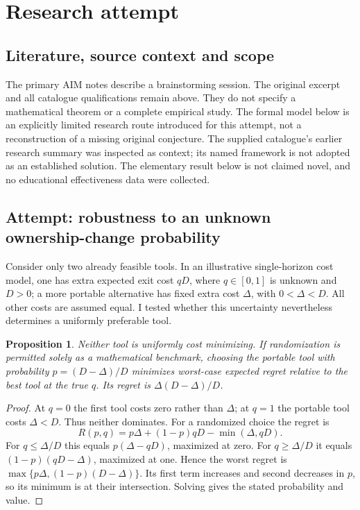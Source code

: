\documentclass[11pt]{article}
\newtheorem{proposition}{Proposition}
\begin{document}
\section{Research attempt}
\subsection{Literature, source context and scope}
The primary AIM notes describe a brainstorming session. The original excerpt and all catalogue qualifications remain above. They do not specify a mathematical theorem or a complete empirical study. The formal model below is an explicitly limited research route introduced for this attempt, not a reconstruction of a missing original conjecture. The supplied catalogue's earlier research summary was inspected as context; its named framework is not adopted as an established solution. The elementary result below is not claimed novel, and no educational effectiveness data were collected.

\subsection{Attempt: robustness to an unknown ownership-change probability}
Consider only two already feasible tools. In an illustrative single-horizon cost model, one has extra expected exit cost $qD$, where $q\in[0,1]$ is unknown and $D>0$; a more portable alternative has fixed extra cost $\Delta$, with $0<\Delta<D$. All other costs are assumed equal. I tested whether this uncertainty nevertheless determines a uniformly preferable tool.
\begin{proposition}
Neither tool is uniformly cost minimizing. If randomization is permitted solely as a mathematical benchmark, choosing the portable tool with probability $p=(D-\Delta)/D$ minimizes worst-case expected regret relative to the best tool at the true $q$. Its regret is $\Delta(D-\Delta)/D$.
\end{proposition}
\begin{proof}
At $q=0$ the first tool costs zero rather than $\Delta$; at $q=1$ the portable tool costs $\Delta<D$. Thus neither dominates. For a randomized choice the regret is
\[
R(p,q)=p\Delta+(1-p)qD-\min(\Delta,qD).
\]
For $q\le\Delta/D$ this equals $p(\Delta-qD)$, maximized at zero. For $q\ge\Delta/D$ it equals $(1-p)(qD-\Delta)$, maximized at one. Hence the worst regret is $\max\{p\Delta,(1-p)(D-\Delta)\}$. Its first term increases and second decreases in $p$, so its minimum is at their intersection. Solving gives the stated probability and value.
\end{proof}
\end{document}
